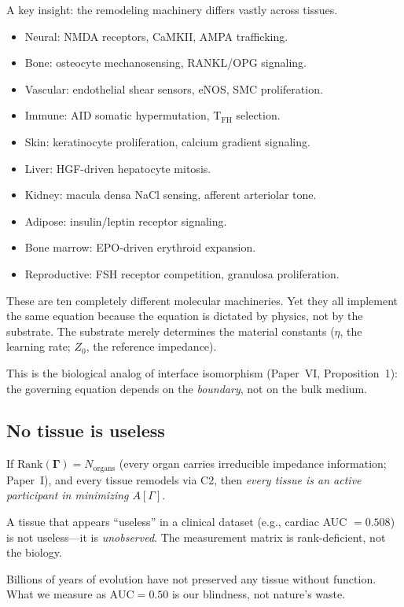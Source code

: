 \documentclass[aps,pre,twocolumn,superscriptaddress,floatfix]{revtex4-2}
\begin{document}
A key insight: the remodeling machinery differs vastly
across tissues.
\begin{itemize}
  \item Neural: NMDA receptors, CaMKII, AMPA trafficking.
  \item Bone: osteocyte mechanosensing, RANKL/OPG signaling.
  \item Vascular: endothelial shear sensors, eNOS, SMC
    proliferation.
  \item Immune: AID somatic hypermutation, T$_{\text{FH}}$
    selection.
  \item Skin: keratinocyte proliferation, calcium gradient
    signaling.
  \item Liver: HGF-driven hepatocyte mitosis.
  \item Kidney: macula densa NaCl sensing, afferent
    arteriolar tone.
  \item Adipose: insulin/leptin receptor signaling.
  \item Bone marrow: EPO-driven erythroid expansion.
  \item Reproductive: FSH receptor competition, granulosa
    proliferation.
\end{itemize}

These are ten completely different molecular machineries.
Yet they all implement the same equation because the
equation is dictated by physics, not by the substrate.
The substrate merely determines the material constants
($\eta$, the learning rate; $Z_0$, the reference impedance).

This is the biological analog of interface isomorphism
(Paper~VI, Proposition~1): the governing equation depends
on the \emph{boundary}, not on the bulk medium.

\subsection{No tissue is useless}

If $\text{Rank}(\mathbf{\Gamma}) = N_{\text{organs}}$
(every organ carries irreducible impedance information;
Paper~I), and every tissue remodels via C2, then
\emph{every tissue is an active participant in
minimizing $A[\Gamma]$}.

A tissue that appears ``useless'' in a clinical dataset
(e.g., cardiac AUC $= 0.508$) is not useless---it is
\emph{unobserved}.  The measurement matrix is rank-deficient,
not the biology.

Billions of years of evolution have not preserved any
tissue without function.  What we measure as
$\text{AUC} = 0.50$ is our blindness, not nature's waste.
\end{document}
